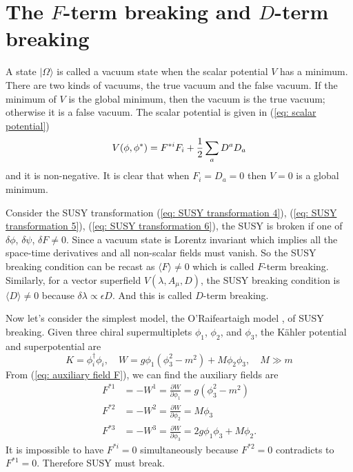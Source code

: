 \documentclass[12pt]{report}
\begin{document}
\section{The $F$-term breaking and $D$-term breaking}
A state $| \Omega \rangle$ is called a vacuum state when the scalar potential $V$ has a minimum.
There are two kinds of vacuums, the true vacuum and the false vacuum.
If the minimum of $V$ is the global minimum, then the vacuum is the true vacuum; otherwise it is a false vacuum.
The scalar potential is given in (\ref{eq: scalar potential})
\begin{equation}
V(\phi, \phi^{*}) = F^{*i} F_{i} + \frac{1}{2} \sum_{a} D^{a} D_{a} \notag
\end{equation}
and it is non-negative. 
It is clear that when $F_{i} = D_{a} = 0$ then $V = 0$ is a global minimum.

Consider the SUSY transformation (\ref{eq: SUSY transformation 4}), (\ref{eq: SUSY transformation 5}), (\ref{eq: SUSY transformation 6}), the SUSY is broken if one of $\delta \phi$, $\delta \psi$, $\delta F \neq 0$.
Since a vacuum state is Lorentz invariant which implies all the space-time derivatives and all non-scalar fields must vanish.
So the SUSY breaking condition can be recast as $\langle F \rangle \neq 0$ which is called $F$-term breaking.
Similarly, for a vector superfield $V(\lambda, A_{\mu}, D)$, the SUSY breaking condition is $\langle D \rangle \neq 0$ because $\delta \lambda \propto \epsilon D$.
And this is called $D$-term breaking.

Now let's consider the simplest model, the O'Raifeartaigh model \cite{O'Raifeartaigh},  of SUSY breaking. Given three chiral supermultiplets $\phi_{1}$, $\phi_{2}$, and $\phi_{3}$, the K\"{a}hler potential and superpotential are 
\begin{equation}
K = \phi^{\dag}_{i} \phi_{i}, \quad
W = g \phi_{1} ( \phi^{2}_{3} - m^{2}) + M \phi_{2} \phi_{3}, \quad
M \gg m
\end{equation}
From (\ref{eq: auxiliary field F}), we can find the auxiliary fields are
\begin{align}
F^{*1} &= - W^{1} = \frac{\partial W}{\partial \phi_{1}} = g ( \phi^{2}_{3} - m^{2})\\
F^{*2} &= - W^{2} = \frac{\partial W}{\partial \phi_{2}} = M \phi_{3}\\
F^{*3} &= - W^{3} = \frac{\partial W}{\partial \phi_{3}} = 2 g \phi_{1} \phi_{3} + M \phi_{2} .
\end{align}
It is impossible to have $F^{*i} = 0$ simultaneously because $F^{*2} = 0$ contradicts to $F^{*1} = 0$.
Therefore SUSY must break.
\end{document}
